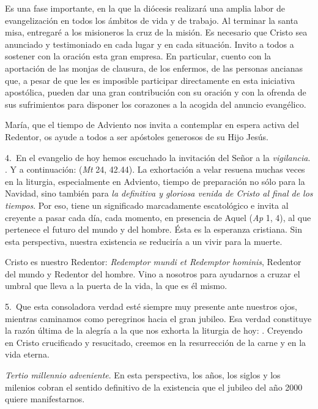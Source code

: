 Es una fase importante, en la que la diócesis realizará una amplia labor de evangelización en todos los ámbitos de vida y de trabajo. Al terminar la santa misa, entregaré a los misioneros la cruz de la misión. Es necesario que Cristo sea anunciado y testimoniado en cada lugar y en cada situación. Invito a todos a sostener con la oración esta gran empresa. En particular, cuento con la aportación de las monjas de clausura, de los enfermos, de las personas ancianas que, a pesar de que les es imposible participar directamente en esta iniciativa apostólica, pueden dar una gran contribución con su oración y con la ofrenda de sus sufrimientos para disponer los corazones a la acogida del anuncio evangélico.

María, que el tiempo de Adviento nos invita a contemplar en espera activa del Redentor, os ayude a todos a ser apóstoles generosos de su Hijo Jesús.

4.~En el evangelio de hoy hemos escuchado la invitación del Señor a la \emph{vigilancia}. . Y a continuación:  (\emph{Mt} 24, 42.44). La exhortación a velar resuena muchas veces en la liturgia, especialmente en Adviento, tiempo de preparación no sólo para la Navidad, sino también para \emph{la definitiva y gloriosa venida de Cristo al final de los tiempos}. Por eso, tiene un significado marcadamente escatológico e invita al creyente a pasar cada día, cada momento, en presencia de Aquel  (\emph{Ap} 1, 4), al que pertenece el futuro del mundo y del hombre. Ésta es la esperanza cristiana. Sin esta perspectiva, nuestra existencia se reduciría a un vivir para la muerte.

Cristo es nuestro Redentor: \emph{Redemptor mundi et Redemptor hominis}, Redentor del mundo y Redentor del hombre. Vino a nosotros para ayudarnos a cruzar el umbral que lleva a la puerta de la vida, la  que es él mismo.

5.~Que esta consoladora verdad esté siempre muy presente ante nuestros ojos, mientras caminamos como peregrinos hacia el gran jubileo. Esa verdad constituye la razón última de la alegría a la que nos exhorta la liturgia de hoy: . Creyendo en Cristo crucificado y resucitado, creemos en la resurrección de la carne y en la vida eterna.

\emph{Tertio millennio adveniente}. En esta perspectiva, los años, los siglos y los milenios cobran el sentido definitivo de la existencia que el jubileo del año 2000 quiere manifestarnos.

